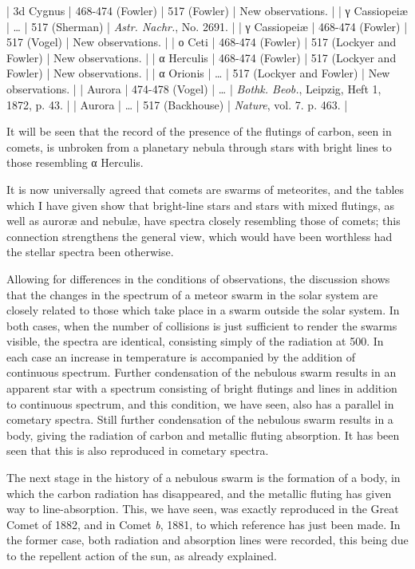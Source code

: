 \documentclass[a4paper, 12pt, oneside, polutonikogreek, english]{article}
\begin{document}
| 3d Cygnus          | 468-474 (Fowler)      | 517 (Fowler)       | New observations.                   |
| γ Cassiopeiæ        | …             | 517 (Sherman)      | \emph{Astr. Nachr.}, No. 2691.               |
| γ Cassiopeiæ        | 468-474 (Fowler)      | 517 (Vogel)       | New observations.                   |
| ο Ceti           | 468-474 (Fowler)      | 517 (Lockyer and Fowler) | New observations.                   |
| α Herculis         | 468-474 (Fowler)      | 517 (Lockyer and Fowler) | New observations.                   |
| α Orionis          | …             | 517 (Lockyer and Fowler) | New observations.                   |
| Aurora           | 474-478 (Vogel)      | …            | \emph{Bothk. Beob.}, Leipzig, Heft 1, 1872, p. 43.     |
| Aurora           | …             | 517 (Backhouse)     | \emph{Nature}, vol. 7. p. 463.               |

It will be seen that the record of the presence of the flutings of carbon, seen in comets, is unbroken from a planetary nebula through stars with bright lines to those resembling α Herculis.

It is now universally agreed that comets are swarms of meteorites, and the tables which I have given show that bright-line stars and stars with mixed flutings, as well as auroræ and nebulæ, have spectra closely resembling those of comets; this connection strengthens the general view, which would have been worthless had the stellar spectra been otherwise.

Allowing for differences in the conditions of observations, the discussion shows that the changes in the spectrum of a meteor swarm in the solar system are closely related to those which take place in a swarm outside the solar system. In both cases, when the number of collisions is just sufficient to render the swarms visible, the spectra are identical, consisting simply of the radiation at 500. In each case an increase in temperature is accompanied by the addition of continuous spectrum. Further condensation of the nebulous swarm results in an apparent star with a spectrum consisting of bright flutings and lines in addition to continuous spectrum, and this condition, we have seen, also has a parallel in cometary spectra. Still further condensation of the nebulous swarm results in a body, giving the radiation of carbon and metallic fluting absorption. It has been seen that this is also reproduced in cometary spectra.

The next stage in the history of a nebulous swarm is the formation of a body, in which the carbon radiation has disappeared, and the metallic fluting has given way to line-absorption. This, we have seen, was exactly reproduced in the Great Comet of 1882, and in Comet \emph{b}, 1881, to which reference has just been made. In the former case, both radiation and absorption lines were recorded, this being due to the repellent action of the sun, as already explained.
\end{document}
